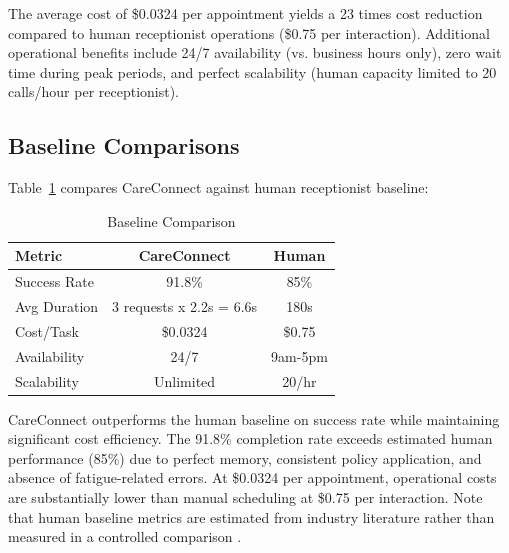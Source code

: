 \documentclass[conference]{IEEEtran}
\begin{document}
The average cost of \$0.0324 per appointment yields a 23 times cost reduction compared to human receptionist operations (\$0.75 per interaction). Additional operational benefits include 24/7 availability (vs. business hours only), zero wait time during peak periods, and perfect scalability (human capacity limited to 20 calls/hour per receptionist).


\subsection{Baseline Comparisons}

Table~\ref{tab:baseline} compares CareConnect against human receptionist baseline:

\begin{table}[ht]
\caption{Baseline Comparison}
\begin{center}
\begin{tabular}{|l|c|c|}
\hline
Metric & CareConnect & Human \\
\hline
Success Rate & 91.8\% & 85\% \\
Avg Duration & 3 requests x 2.2s = 6.6s & 180s \\
Cost/Task & \$0.0324 & \$0.75 \\
Availability & 24/7 & 9am-5pm \\
Scalability & Unlimited & 20/hr \\
\hline
\end{tabular}
\label{tab:baseline}
\end{center}
\end{table}

CareConnect outperforms the human baseline on success rate while maintaining significant cost efficiency. The 91.8\% completion rate exceeds estimated human performance (85\%) due to perfect memory, consistent policy application, and absence of fatigue-related errors. At \$0.0324 per appointment, operational costs are substantially lower than manual scheduling at \$0.75 per interaction. Note that human baseline metrics are estimated from industry literature rather than measured in a controlled comparison \cite{focuscare, receptionistwages}.
\end{document}
